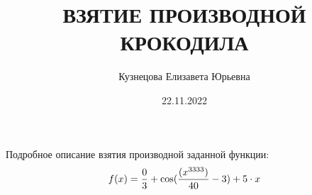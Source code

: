 \documentclass[12pt, letterpaper, twoside]{article}
\title{ВЗЯТИЕ ПРОИЗВОДНОЙ КРОКОДИЛА}
\author{Кузнецова Елизавета Юрьевна}
\date{22.11.2022}
\begin{document}
\maketitle
\newpage
Подробное описание взятия производной заданной функции:
\[f(x) ={{0} \over {3}} + \cos({({{x}^{3333}}) \over {40}} - 3) + 5 \cdot x\]
\end{document}

